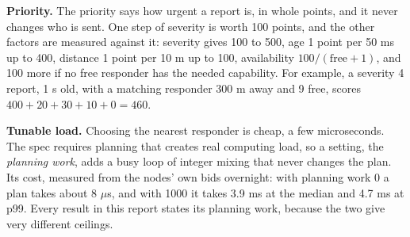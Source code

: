 \textbf{Priority.} The priority says how urgent a report is, in whole points, and it never changes who is sent. One step of severity is worth 100 points, and the other factors are measured against it: severity gives 100 to 500, age 1 point per 50 ms up to 400, distance 1 point per 10 m up to 100, availability $100/(\text{free}+1)$, and 100 more if no free responder has the needed capability. For example, a severity 4 report, 1 s old, with a matching responder 300 m away and 9 free, scores $400 + 20 + 30 + 10 + 0 = 460$.

\textbf{Tunable load.} Choosing the nearest responder is cheap, a few microseconds. The spec requires planning that creates real computing load, so a setting, the \emph{planning work}, adds a busy loop of integer mixing that never changes the plan. Its cost, measured from the nodes' own bids overnight: with planning work 0 a plan takes about 8 $\mu$s, and with 1000 it takes 3.9 ms at the median and 4.7 ms at p99. Every result in this report states its planning work, because the two give very different ceilings.

